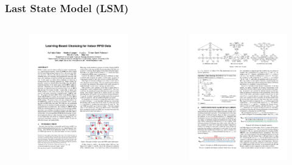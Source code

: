 \begin{frame}
\frametitle{Last State Model (LSM)}

\begin{columns}

  \vspace{-10pt}
  \begin{figure}[tb]
    \includegraphics[width=0.75\columnwidth]{figures/3-5/3-5-1.pdf}
  \end{figure}
  \vspace{-20pt}
  \begin{figure}[tb]
    \includegraphics[width=0.75\columnwidth]{figures/3-5/3-5-7.pdf}
  \end{figure}


\end{columns}
\end{frame}
